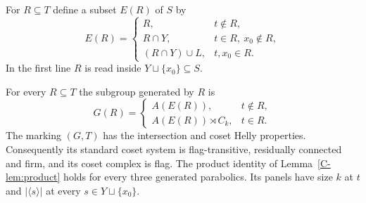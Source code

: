 For $R\subseteq T$ define a subset $E(R)$ of $S$ by
\[
 E(R)=\begin{cases}
 R,&t\notin R,\\
 R\cap Y,&t\in R,\ x_0\notin R,\\
 (R\cap Y)\cup L,&t,x_0\in R.
 \end{cases}
\]
In the first line $R$ is read inside $Y\sqcup\{x_0\}\subseteq S$.
\begin{theorem}\label{C-thm:cyclic}
For every $R\subseteq T$ the subgroup generated by $R$ is
\begin{equation}\label{C-eq:all-subgroups}
 G(R)=\begin{cases}
 A(E(R)),&t\notin R,\\
 A(E(R))\rtimes C_k,&t\in R.
 \end{cases}
\end{equation}
The marking $(G,T)$ has the intersection and coset Helly properties.
Consequently its standard coset system is flag-transitive, residually
connected and firm, and its coset complex is flag. The product identity
of Lemma~\ref{C-lem:product} holds for every three generated parabolics.
Its panels have size $k$ at $t$ and $|\langle s\rangle|$ at every
$s\in Y\sqcup\{x_0\}$.
\end{theorem}
